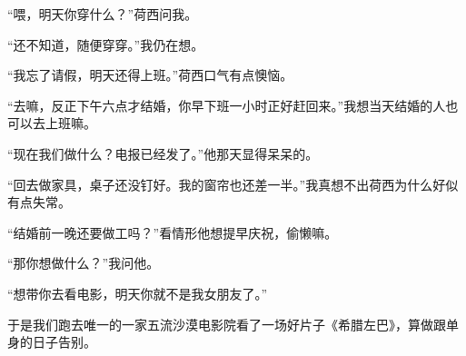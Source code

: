 \par “喂，明天你穿什么？”荷西问我。
\par “还不知道，随便穿穿。”我仍在想。
\par “我忘了请假，明天还得上班。”荷西口气有点懊恼。
\par “去嘛，反正下午六点才结婚，你早下班一小时正好赶回来。”我想当天结婚的人也可以去上班嘛。
\par “现在我们做什么？电报已经发了。”他那天显得呆呆的。
\par “回去做家具，桌子还没钉好。我的窗帘也还差一半。”我真想不出荷西为什么好似有点失常。
\par “结婚前一晚还要做工吗？”看情形他想提早庆祝，偷懒嘛。
\par “那你想做什么？”我问他。
\par “想带你去看电影，明天你就不是我女朋友了。”
\par 于是我们跑去唯一的一家五流沙漠电影院看了一场好片子《希腊左巴》，算做跟单身的日子告别。

